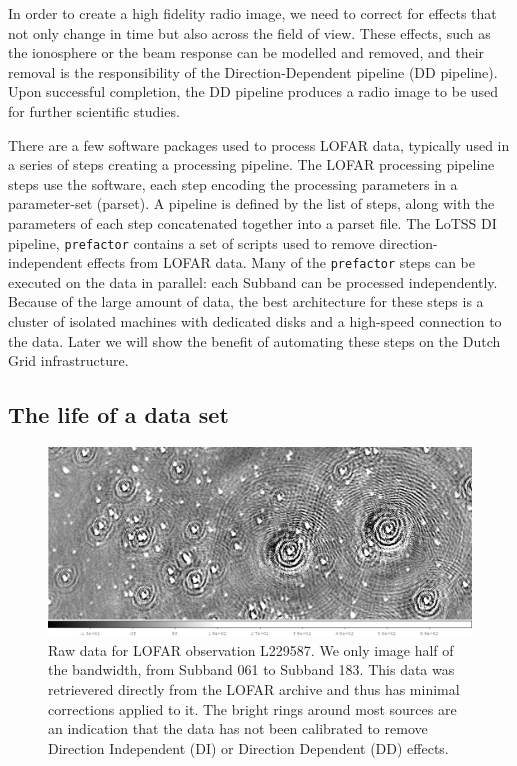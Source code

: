 In order to create a high fidelity radio image, we need to correct for effects that not only change in time but also across the field of view. These effects, such as the ionosphere or the beam response can be modelled and removed, and their removal is the responsibility of the Direction-Dependent pipeline (DD pipeline). Upon successful completion, the DD pipeline produces a radio image to be used for further scientific studies.

There are a few software packages used to process LOFAR data, typically used in a series of steps creating a processing pipeline. The LOFAR processing pipeline steps use the software, each step encoding the processing parameters in a parameter-set (parset). A pipeline is defined by the list of steps, along with the parameters of each step concatenated together into a parset file. The LoTSS DI pipeline, \texttt{prefactor} contains a set of scripts used to remove direction-independent effects from LOFAR data. Many of the \texttt{prefactor} steps can be executed on the data in parallel: each Subband can be processed independently. Because of the large amount of data, the best architecture for these steps is a cluster of isolated machines with dedicated disks and a high-speed connection to the data. Later we will show the benefit of automating these steps on the Dutch Grid infrastructure. 

\subsection{The life of a data set}

\begin{figure}[!htb]
    \centering
    \includegraphics[width=.8\linewidth]{background/figures/raw_image1_brighter.jpeg}
    \caption[Image of the raw data]{Raw data for LOFAR observation L229587. We only image half of the bandwidth, from Subband 061 to Subband 183. This data was retrievered directly from the LOFAR archive and thus has minimal corrections applied to it. The bright rings around most sources are an indication that the data has not been calibrated to remove Direction Independent (DI) or Direction Dependent (DD) effects. }
    \label{fig:L229587_raw}
\end{figure}


